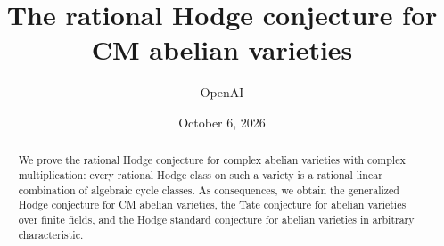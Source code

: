 \documentclass[11pt]{article}
\title{The rational Hodge conjecture for CM abelian varieties}
\author{OpenAI}
\date{October 6, 2026}
\begin{document}
\maketitle

\begin{abstract}
We prove the rational Hodge conjecture for complex abelian varieties
with complex multiplication: every rational Hodge class on such a
variety is a rational linear combination of algebraic cycle classes.
As consequences, we obtain the generalized Hodge conjecture for CM
abelian varieties, the Tate conjecture for abelian varieties over finite
fields, and the Hodge standard conjecture for abelian varieties in
arbitrary characteristic.
\end{abstract}


\tableofcontents












{}
\begingroup
\small

\endgroup
\end{document}
